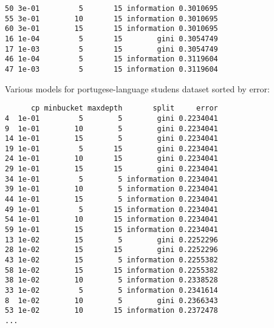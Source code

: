 \documentclass[a4paper]{article}
\begin{document}
\begin{verbatim}
50 3e-01         5       15 information 0.3010695
55 3e-01        10       15 information 0.3010695
60 3e-01        15       15 information 0.3010695
16 1e-04         5       15        gini 0.3054749
17 1e-03         5       15        gini 0.3054749
46 1e-04         5       15 information 0.3119604
47 1e-03         5       15 information 0.3119604
\end{verbatim}


Various models for portugese-language studens dataset sorted by error:
\begin{verbatim}
      cp minbucket maxdepth       split     error
4  1e-01         5        5        gini 0.2234041
9  1e-01        10        5        gini 0.2234041
14 1e-01        15        5        gini 0.2234041
19 1e-01         5       15        gini 0.2234041
24 1e-01        10       15        gini 0.2234041
29 1e-01        15       15        gini 0.2234041
34 1e-01         5        5 information 0.2234041
39 1e-01        10        5 information 0.2234041
44 1e-01        15        5 information 0.2234041
49 1e-01         5       15 information 0.2234041
54 1e-01        10       15 information 0.2234041
59 1e-01        15       15 information 0.2234041
13 1e-02        15        5        gini 0.2252296
28 1e-02        15       15        gini 0.2252296
43 1e-02        15        5 information 0.2255382
58 1e-02        15       15 information 0.2255382
38 1e-02        10        5 information 0.2338528
33 1e-02         5        5 information 0.2341614
8  1e-02        10        5        gini 0.2366343
53 1e-02        10       15 information 0.2372478
...
\end{verbatim}
\end{document}
